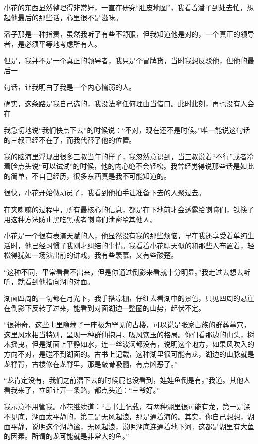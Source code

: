 小花的东西显然整理得非常好，一直在研究“肚皮地图”，我看着潘子到处去忙，想起他最后的那些话，心里很不是滋味。

潘子那是一种指责，虽然我听了有些不舒服，但我知道他是对的，一个真正的领导者，是必须平等地考虑所有人。

但是，我并不是一个真正的领导者，我只是个冒牌货，当时我想反驳他，但他的最后一

句话，让我明白了我是一个内心懦弱的人。

确实，这条路是我自己选的，我没法拿任何理由当借口。此时此刻，再也没有人会在

我急切地说“我们快点下去”的时候说：“不对，现在还不是时候。”唯一能说这句话的三叔已经不在了，而我代替了他的位置。

我的脑海里浮现出很多三叔当年的样子，我忽然意识到，当三叔说着“不行”或者冷着脸点头说“可以试试”的时候，他的内心绝不会轻松。我曾经觉得说那些话是如此的简单，不自己经历，很多东西真是我不可能知道的。

很快，小花开始做动员了，我看到他拍手让准备下去的人聚过去。

在夹喇嘛的过程中，所有最核心的信息，都是在下地前才会透露给喇嘛们，铁筷子用这种方法防止黑吃黑或者喇嘛们泄密给其他人。

小花是一个很有表演天赋的人，他显然没有我的那些烦恼，早在我还享受着单纯生活时，他已经习惯了我刚才纠结的事情。我看着小花聊天似的和那些人布置着，轻松得犹如一场演出前的讲戏，我有些羡慕，又有些酸楚。

“这种不同，平常看看不出来，但是你通过倒影来看就十分明显。”我走过去想去听听，就看到他指向湖的对面。

湖面四周的一切都在月光下，我手搭凉棚，仔细去看湖中的景色，只见四周的悬崖在倒影下反转了过来，能看到对面湖边一整圈的山势，起伏不定。

“很神奇，这些山里隐藏了一座极为罕见的古楼，可以说是张家古族的群葬墓穴，这里风水相当特别，呈现一种群仙抱月、吸风饮玉的格局。你们看那边的山头，树木摇曳，但是湖面上平静如水，连一丝波澜都没有，说明这个地方，如果风吹入的方向不对，是碰不到湖面的。古书上记载，这种湖里很可能有龙，湖边的山脉就是龙脊背，古楼修在龙脊里，那是敲骨吸髓，有点凶恶了。”

“龙肯定没有，我们之前潜下去的时候屁也没看到，娃娃鱼倒是有。”我道。其他人看我来了，立即让开一条路，都点头道：“三爷好。”

我示意不用管我。小花继续道：“古书上记载，有两种湖里很可能有龙，第一是深不见底，湖面太平静的，第二是无风起浪，那是通着海的。其实，你自己想想，湖面平静，说明这个湖静谧，无风起浪，说明湖底连通着地下河，这都是湖里有大鱼的因素。所谓的龙可能就是非常大的鱼。”

